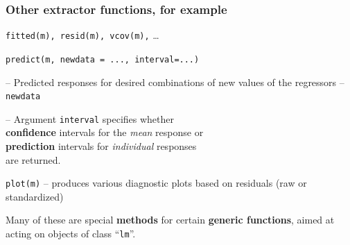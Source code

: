 \documentclass[12pt,dvipsnames,t,handout%
,aspectratio=169%
]{beamer}
\begin{document}
\begin{frame}[fragile]\frametitle{Other extractor functions, for example}

\bi
\item \texttt{fitted(m), resid(m), vcov(m),} \dots 
\medskip
\item \texttt{predict(m, newdata = ..., interval=...)} 
\bi
{\normalsize
\item[--] Predicted responses for desired combinations 
of new values of the regressors -- {\tt newdata}
\medskip
\item[--] Argument {\tt interval} specifies whether \\
{\bf confidence} intervals for the {\it mean} response or \\ {\bf prediction} intervals
for {\it individual} responses \\ are returned.
}
\ei
\item \texttt{plot(m)} -- produces various diagnostic plots based
on residuals (raw or standardized)
\ei

Many of these are special {\bf methods} for certain {\bf generic functions},  
aimed at acting on objects of class ``{\tt lm}''.  

 
\vfill
\end{frame}
\end{document}
